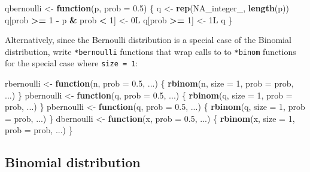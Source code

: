 \documentclass[]{book}
\newenvironment{Shaded}{\begin{snugshade}}{\end{snugshade}}
\newcommand{\ControlFlowTok}[1]{\textcolor[rgb]{0.13,0.29,0.53}{\textbf{#1}}}
\newcommand{\DataTypeTok}[1]{\textcolor[rgb]{0.13,0.29,0.53}{#1}}
\newcommand{\DecValTok}[1]{\textcolor[rgb]{0.00,0.00,0.81}{#1}}
\newcommand{\FloatTok}[1]{\textcolor[rgb]{0.00,0.00,0.81}{#1}}
\newcommand{\KeywordTok}[1]{\textcolor[rgb]{0.13,0.29,0.53}{\textbf{#1}}}
\newcommand{\NormalTok}[1]{#1}
\newcommand{\OperatorTok}[1]{\textcolor[rgb]{0.81,0.36,0.00}{\textbf{#1}}}
\newcommand{\OtherTok}[1]{\textcolor[rgb]{0.56,0.35,0.01}{#1}}
\newcommand{\StringTok}[1]{\textcolor[rgb]{0.31,0.60,0.02}{#1}}
\theoremstyle{definition}
\theoremstyle{definition}
\theoremstyle{definition}
\theoremstyle{remark}
\begin{document}
\begin{Shaded}
\begin{Highlighting}[]
\NormalTok{qbernoulli <-}\StringTok{ }\ControlFlowTok{function}\NormalTok{(p, }\DataTypeTok{prob =} \FloatTok{0.5}\NormalTok{) \{}
\NormalTok{  q <-}\StringTok{ }\KeywordTok{rep}\NormalTok{(}\OtherTok{NA_integer_}\NormalTok{, }\KeywordTok{length}\NormalTok{(p))}
\NormalTok{  q[prob }\OperatorTok{>=}\StringTok{ }\DecValTok{1} \OperatorTok{-}\StringTok{ }\NormalTok{p }\OperatorTok{&}\StringTok{ }\NormalTok{prob }\OperatorTok{<}\StringTok{ }\DecValTok{1}\NormalTok{] <-}\StringTok{ }\NormalTok{0L}
\NormalTok{  q[prob }\OperatorTok{>=}\StringTok{ }\DecValTok{1}\NormalTok{] <-}\StringTok{ }\NormalTok{1L}
\NormalTok{  q}
\NormalTok{\}}
\end{Highlighting}
\end{Shaded}

Alternatively, since the Bernoulli distribution is a special case of the
Binomial distribution, write \texttt{*bernoulli} functions that wrap
calls to to \texttt{*binom} functions for the special case where
\texttt{size\ =\ 1}:

\begin{Shaded}
\begin{Highlighting}[]
\NormalTok{rbernoulli <-}\StringTok{ }\ControlFlowTok{function}\NormalTok{(n, }\DataTypeTok{prob =} \FloatTok{0.5}\NormalTok{, ...) \{}
  \KeywordTok{rbinom}\NormalTok{(n, }\DataTypeTok{size =} \DecValTok{1}\NormalTok{, }\DataTypeTok{prob =}\NormalTok{ prob, ...)}
\NormalTok{\}}
\NormalTok{pbernoulli <-}\StringTok{ }\ControlFlowTok{function}\NormalTok{(q, }\DataTypeTok{prob =} \FloatTok{0.5}\NormalTok{, ...) \{}
  \KeywordTok{rbinom}\NormalTok{(q, }\DataTypeTok{size =} \DecValTok{1}\NormalTok{, }\DataTypeTok{prob =}\NormalTok{ prob, ...)}
\NormalTok{\}}
\NormalTok{pbernoulli <-}\StringTok{ }\ControlFlowTok{function}\NormalTok{(q, }\DataTypeTok{prob =} \FloatTok{0.5}\NormalTok{, ...) \{}
  \KeywordTok{rbinom}\NormalTok{(q, }\DataTypeTok{size =} \DecValTok{1}\NormalTok{, }\DataTypeTok{prob =}\NormalTok{ prob, ...)}
\NormalTok{\}}
\NormalTok{dbernoulli <-}\StringTok{ }\ControlFlowTok{function}\NormalTok{(x, }\DataTypeTok{prob =} \FloatTok{0.5}\NormalTok{, ...) \{}
  \KeywordTok{rbinom}\NormalTok{(x, }\DataTypeTok{size =} \DecValTok{1}\NormalTok{, }\DataTypeTok{prob =}\NormalTok{ prob, ...)}
\NormalTok{\}}
\end{Highlighting}
\end{Shaded}

\hypertarget{binomial-distribution}{%
\subsection{Binomial distribution}\label{binomial-distribution}}
\end{document}
